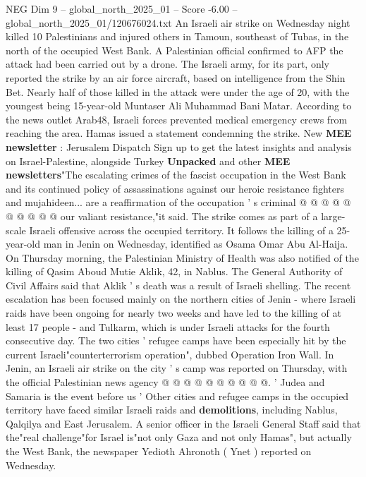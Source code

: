 \begin{textsample}{NEG Dim 9 – global\_north\_2025\_01 – Score -6.00 – global\_north\_2025\_01/120676024.txt}  \label{ex:f9_neg_098}
An Israeli air strike on Wednesday night killed 10 Palestinians and injured others in Tamoun, southeast of Tubas, in the north of the occupied West Bank.
A Palestinian official confirmed to AFP the attack had been carried out by a drone.
The Israeli army, for its part, only reported the strike by an air force aircraft, based on intelligence from the Shin Bet.
Nearly half of those killed in the attack were under the age of 20, with the youngest being 15-year-old Muntaser Ali Muhammad Bani Matar.
According to the news outlet Arab48, Israeli forces prevented medical emergency crews from reaching the area.
Hamas issued a statement condemning the strike.
New \textbf{MEE} \textbf{newsletter} : Jerusalem Dispatch Sign up to get the latest insights and analysis on Israel-Palestine, alongside Turkey \textbf{Unpacked} and other \textbf{MEE} \textbf{newsletters}"The escalating crimes of the fascist occupation in the West Bank and its continued policy of assassinations against our heroic resistance fighters and mujahideen... are a reaffirmation of the occupation ' s criminal @ @ @ @ @ @ @ @ @ @ our valiant resistance,"it said.
The strike comes as part of a large-scale Israeli offensive across the occupied territory.
It follows the killing of a 25-year-old man in Jenin on Wednesday, identified as Osama Omar Abu Al-Haija.
On Thursday morning, the Palestinian Ministry of Health was also notified of the killing of Qasim Aboud Mutie Aklik, 42, in Nablus.
The General Authority of Civil Affairs said that Aklik ' s death was a result of Israeli shelling.
The recent escalation has been focused mainly on the northern cities of Jenin - where Israeli raids have been ongoing for nearly two weeks and have led to the killing of at least 17 people - and Tulkarm, which is under Israeli attacks for the fourth consecutive day.
The two cities ' refugee camps have been especially hit by the current Israeli"counterterrorism operation", dubbed Operation Iron Wall.
In Jenin, an Israeli air strike on the city ' s camp was reported on Thursday, with the official Palestinian news agency @ @ @ @ @ @ @ @ @ @. ' Judea and Samaria is the event before us ' Other cities and refugee camps in the occupied territory have faced similar Israeli raids and \textbf{demolitions}, including Nablus, Qalqilya and East Jerusalem.
A senior officer in the Israeli General Staff said that the"real challenge"for Israel is"not only Gaza and not only Hamas", but actually the West Bank, the newspaper Yedioth Ahronoth ( Ynet ) reported on Wednesday.

\end{textsample}
